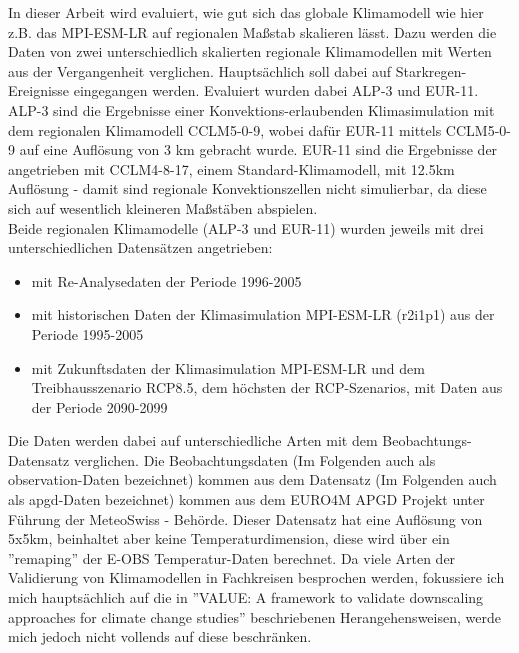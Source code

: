 In dieser Arbeit wird evaluiert, wie gut sich das globale Klimamodell wie hier z.B. das MPI-ESM-LR auf regionalen Maßstab skalieren lässt. Dazu werden die Daten von zwei unterschiedlich skalierten regionale Klimamodellen mit Werten aus der Vergangenheit verglichen. Hauptsächlich soll dabei auf Starkregen-Ereignisse eingegangen werden. Evaluiert wurden dabei ALP-3 und EUR-11. ALP-3 sind  die Ergebnisse einer Konvektions-erlaubenden Klimasimulation mit dem regionalen Klimamodell CCLM5-0-9, wobei dafür EUR-11 mittels CCLM5-0-9 auf eine Auflösung von 3 km gebracht wurde. EUR-11 sind die Ergebnisse der angetrieben mit CCLM4-8-17, einem Standard-Klimamodell, mit 12.5km Auflösung - damit sind regionale Konvektionszellen nicht simulierbar, da diese sich auf wesentlich kleineren Maßstäben abspielen.\\
Beide regionalen Klimamodelle (ALP-3 und EUR-11) wurden jeweils mit drei unterschiedlichen Datensätzen angetrieben: 
\begin{itemize}
	\item mit Re-Analysedaten der Periode 1996-2005
	\item mit historischen Daten der Klimasimulation MPI-ESM-LR (r2i1p1) aus der Periode 1995-2005
	\item mit Zukunftsdaten der Klimasimulation MPI-ESM-LR und dem Treibhausszenario RCP8.5, dem höchsten der RCP-Szenarios, mit Daten aus der Periode 2090-2099
\end{itemize}
Die Daten werden dabei auf unterschiedliche Arten mit dem Beobachtungs-Datensatz verglichen. Die Beobachtungsdaten (Im Folgenden auch als observation-Daten bezeichnet) kommen aus dem Datensatz (Im Folgenden auch als apgd-Daten bezeichnet) kommen aus dem EURO4M APGD Projekt unter Führung der MeteoSwiss - Behörde\cite{meteoswiss}. Dieser Datensatz hat eine Auflösung von 5x5km, beinhaltet aber keine Temperaturdimension, diese wird über ein ''remaping'' der E-OBS Temperatur-Daten berechnet.
Da viele Arten der Validierung von Klimamodellen in Fachkreisen besprochen werden, fokussiere ich mich hauptsächlich auf die in ''VALUE: A framework to validate downscaling approaches for climate change studies'' \cite{maraun_value} beschriebenen Herangehensweisen, werde mich jedoch nicht vollends auf diese beschränken.